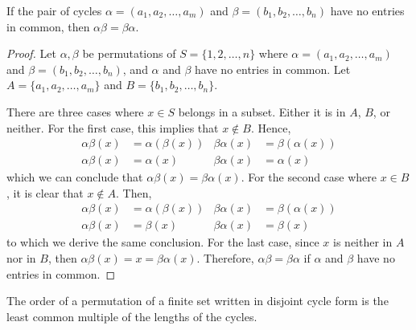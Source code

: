     \begin{thm}
        If the pair of cycles \(\alpha = (a_1, a_2, \ldots, a_m)\) and \(\beta = (b_1, b_2, \ldots, b_n)\) have no entries in common, then \(\alpha\beta = \beta\alpha\).
    \end{thm}

    \begin{proof}
        Let \(\alpha, \beta\) be permutations of \(S = \{1, 2, \ldots, n\}\) where \(\alpha = (a_1, a_2, \ldots, a_m)\) and \(\beta = (b_1, b_2, \ldots, b_n)\), and \(\alpha\) and \(\beta\) have no entries in common. Let \(A = \{a_1, a_2, \ldots, a_m\}\) and \(B = \{b_1, b_2, \ldots, b_n\}\).

        There are three cases where \(x\in S\) belongs in a subset. Either it is in \(A\), \(B\), or neither. For the first case, this implies that \(x\not\in B\). Hence,
        \begin{align*}
            \alpha\beta(x) &= \alpha(\beta(x)) & \beta\alpha(x) &= \beta(\alpha(x)) \\
            \alpha\beta(x) &= \alpha(x) & \beta\alpha(x) &= \alpha(x)
        \end{align*}
        which we can conclude that \(\alpha\beta(x) = \beta\alpha(x)\). For the second case where \(x\in B\), it is clear that \(x\not\in A\). Then,
        \begin{align*}
            \alpha\beta(x) &= \alpha(\beta(x)) & \beta\alpha(x) &= \beta(\alpha(x)) \\
            \alpha\beta(x) &= \beta(x) & \beta\alpha(x) &= \beta(x)
        \end{align*}
        to which we derive the same conclusion. For the last case, since \(x\) is neither in \(A\) nor in \(B\), then \(\alpha\beta(x) = x = \beta\alpha(x)\). Therefore, \(\alpha\beta = \beta\alpha\) if \(\alpha\) and \(\beta\) have no entries in common.
    \end{proof}

    \begin{thm}
        The order of a permutation of a finite set written in disjoint cycle form is the least common multiple of the lengths of the cycles.
    \end{thm}

